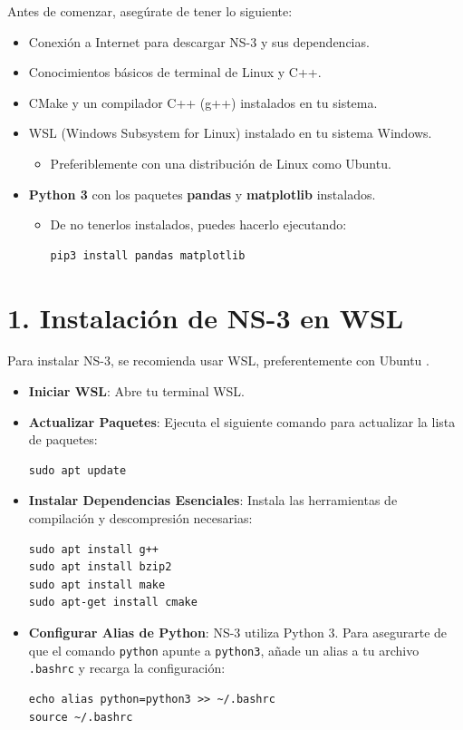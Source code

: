 \documentclass{article}
\begin{document}
Antes de comenzar, asegúrate de tener lo siguiente:
\begin{itemize}
    \item Conexión a Internet para descargar NS-3 y sus dependencias.
    \item Conocimientos básicos de terminal de Linux y C++.
    \item CMake y un compilador C++ (g++) instalados en tu sistema.
    \item WSL (Windows Subsystem for Linux) instalado en tu sistema Windows.
        \begin{itemize}
            \item Preferiblemente con una distribución de Linux como Ubuntu.
        \end{itemize}
    \item \textbf{Python 3} con los paquetes \textbf{pandas} y \textbf{matplotlib} instalados.
        \begin{itemize}
            \item De no tenerlos instalados, puedes hacerlo ejecutando:
            \begin{lstlisting}
pip3 install pandas matplotlib
            \end{lstlisting}
        \end{itemize}
\end{itemize}

\section*{\textbf{1. Instalación de NS-3 en WSL}}
Para instalar NS-3, se recomienda usar WSL, preferentemente con Ubuntu .

\begin{itemize}
    \item \textbf{Iniciar WSL}: Abre tu terminal WSL.
    \item \textbf{Actualizar Paquetes}: Ejecuta el siguiente comando para actualizar la lista de paquetes:
    \begin{lstlisting}
sudo apt update 
    \end{lstlisting}
    \item \textbf{Instalar Dependencias Esenciales}: Instala las herramientas de compilación y descompresión necesarias:
    \begin{lstlisting}
sudo apt install g++
sudo apt install bzip2
sudo apt install make 
sudo apt-get install cmake 
    \end{lstlisting}
    \item \textbf{Configurar Alias de Python}: NS-3 utiliza Python 3. Para asegurarte de que el comando \texttt{python} apunte a \texttt{python3}, añade un alias a tu archivo \texttt{.bashrc} y recarga la configuración:
    \begin{lstlisting}
echo alias python=python3 >> ~/.bashrc 
source ~/.bashrc 
    \end{lstlisting}
\end{itemize}
\end{document}
